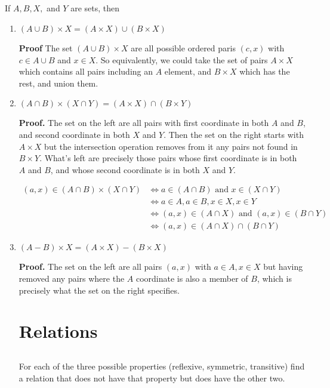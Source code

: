 \documentclass{article}
\newcommand{\tand}{\text{ and }}
\begin{document}
\subsection{} If $A, B, X,$ and $Y$ are sets, then
\begin{enumerate}[i]
    \item $(A \cup B) \times X = (A \times X) \cup (B \times X)$

    \textbf{Proof} The set $(A \cup B) \times X$ are all possible ordered paris $(c, x)$ with $c \in A \cup B$ and $x \in X$. So equivalently, we could take the set of pairs $A \times X$ which contains all pairs including an $A$ element, and $B \times X$ which has the rest, and union them.

    \item $(A \cap B) \times (X \cap Y) = (A \times X) \cap (B \times Y)$
    
    \textbf{Proof.} The set on the left are all pairs with first coordinate in both $A$ and $B$, and second coordinate in both $X$ and $Y$. Then the set on the right starts with $A \times X$ but the intersection operation removes from it any pairs not found in $B \times Y$. What's left are precisely those pairs whose first coordinate is in both $A$ and $B$, and whose second coordinate is in both $X$ and $Y$.

    \begin{align*}
        (a, x) \in (A \cap B) \times (X \cap Y) &\iff a \in (A \cap B) \tand x \in (X \cap Y)\\
        &\iff a \in A, a \in B, x \in X, x \in Y\\
        &\iff (a, x) \in (A \cap X) \tand (a, x) \in (B \cap Y)\\
        &\iff (a, x) \in (A \cap X) \cap (B \cap Y) 
    \end{align*}

    \item $(A - B) \times X = (A \times X) - (B \times X)$
    
    \textbf{Proof.} The set on the left are all pairs $(a, x)$ with $a \in A, x \in X$ but having removed any pairs where the $A$ coordinate is also a member of $B$, which is precisely what the set on the right specifies.

\section{Relations}

\subsection{} For each of the three possible properties (reflexive, symmetric, transitive) find a relation that does not have that property but does have the other two. 


\end{enumerate}
\end{document}
